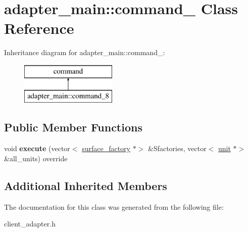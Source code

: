 \hypertarget{classadapter__main_1_1command__8}{}\section{adapter\+\_\+main\+:\+:command\+\_ Class Reference}
\label{classadapter__main_1_1command__8}
Inheritance diagram for adapter\+\_\+main\+:\+:command\+\_\+:\begin{figure}[H]
\begin{center}
\leavevmode
\includegraphics[height=2.000000cm]{classadapter__main_1_1command__8}
\end{center}
\end{figure}
\subsection*{Public Member Functions}
\begin{DoxyCompactItemize}
\item 
\mbox{\label{classadapter__main_1_1command__8_aaa7095401388176c1e53d3cd21f6b264}} 
void {\bfseries execute} (vector$<$ \mbox{\hyperlink{classsurface__factory}{surface\+\_\+factory}} $\ast$$>$ \&Sfactories, vector$<$ \mbox{\hyperlink{classunit}{unit}} $\ast$$>$ \&all\+\_\+units) override
\end{DoxyCompactItemize}
\subsection*{Additional Inherited Members}


The documentation for this class was generated from the following file\+:\begin{DoxyCompactItemize}
\item 
client\+\_\+adapter.\+h\end{DoxyCompactItemize}
